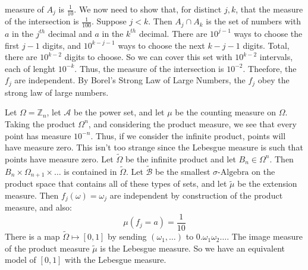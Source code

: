         measure of $A_{j}$ is $\frac{1}{10}$. We now need to
        show that, for distinct $j,k$, that the measure of the
        intersection is $\frac{1}{100}$. Suppose $j<k$. Then
        $A_{j}\cap{A}_{k}$ is the set of numbers with $a$ in
        the $j^{th}$ decimal and $a$ in the $k^{th}$ decimal.
        There are $10^{j-1}$ ways to choose the first
        $j-1$ digits, and $10^{k-j-1}$ ways to choose the
        next $k-j-1$ digits. Total, there are
        $10^{k-2}$ digits to choose. So we can cover this
        set with $10^{k-2}$ intervals, each of lenght
        $10^{\minus{k}}$. Thus, the measure of the intersection
        is $10^{\minus{2}}$. Theefore, the $f_{j}$ are
        independent. By Borel's Strong Law of Large Numbers,
        the $f_{j}$ obey the strong law of large numbers.
        \par\hfill\par
        Let $\Omega=\mathbb{Z}_{n}$, let $\mathcal{A}$ be
        the power set, and let $\mu$ be the counting
        measure on $\Omega$. Taking the product
        $\Omega^{n}$, and considering the product measure,
        we see that every point has measure $10^{\minus{n}}$.
        Thus, if we consider the infinite product, points will
        have measure zero. This isn't too strange since the
        Lebesgue measure is such that points have measure
        zero. Let $\tilde{\Omega}$ be the infinite product
        and let $B_{n}\in\Omega^{n}$. Then
        $B_{n}\times\Omega_{n+1}\times\dots$ is contained in
        $\tilde{\Omega}$. Let $\tilde{\mathcal{B}}$ be the
        smallest $\sigma\textrm{-Algebra}$ on the product
        space that contains all of these types of sets, and let
        $\tilde{\mu}$ be the extension measure. Then
        $f_{j}(\omega)=\omega_{j}$ are independent by
        construction of the product measure, and also:
        \begin{equation}
            \mu(f_{j}=a)=\frac{1}{10}
        \end{equation}
        There is a map $\tilde{\Omega}\mapsto[0,1]$ by sending
        $(\omega_{1},\dots)$ to $0.\omega_{1}\omega_{2}\dots$.
        The image measure of the product measure $\tilde{\mu}$
        is the Lebesgue measure. So we have an equivalent
        model of $[0,1]$ with the Lebesgue measure.
